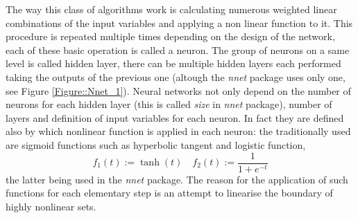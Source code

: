 \documentclass[a4paper,12pt]{article}
\begin{document}
The way this class of algorithms work is calculating numerous weighted linear combinations of the input variables and applying a non linear function to it.
This procedure is repeated multiple times depending on the design of the network, each of these basic operation is called a neuron.
The group of neurons on a same level is called hidden layer, there can be multiple hidden layers each performed taking the outputs of the previous one (altough the \textit{nnet} package uses only one, see Figure \ref{Figure::Nnet_1}).
Neural networks not only depend on the number of neurons for each hidden layer (this is called \textit{size} in \textit{nnet} package), number of layers and definition of input variables for each neuron. In fact they are defined also by which nonlinear function is applied in each neuron: the traditionally used are sigmoid functions such as hyperbolic tangent and logistic function, $$f_{1}(t):=\tanh(t) \quad f_{2}(t):= \frac{1}{1+ e^{-t}} $$ the latter being used in the \textit{nnet} package. The reason for the application of such functions for each elementary step is an attempt to linearise the boundary of highly nonlinear sets. 
\end{document}
